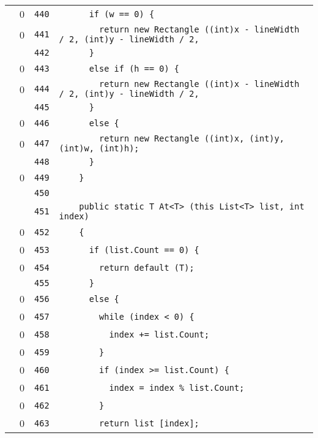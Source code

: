 \documentclass[a4paper,10pt]{article}
\begin{document}
\begin{longtable}[l]{lrrl}
\cellcolor{red} & 0 & \verb~440~ & \verb~      if (w == 0) {~\\
\cellcolor{red} & 0 & \verb~441~ & \verb~        return new Rectangle ((int)x - lineWidth / 2, (int)y - lineWidth / 2, ~\\
\cellcolor{gray} &  & \verb~442~ & \verb~      }~\\
\cellcolor{red} & 0 & \verb~443~ & \verb~      else if (h == 0) {~\\
\cellcolor{red} & 0 & \verb~444~ & \verb~        return new Rectangle ((int)x - lineWidth / 2, (int)y - lineWidth / 2, ~\\
\cellcolor{gray} &  & \verb~445~ & \verb~      }~\\
\cellcolor{red} & 0 & \verb~446~ & \verb~      else {~\\
\cellcolor{red} & 0 & \verb~447~ & \verb~        return new Rectangle ((int)x, (int)y, (int)w, (int)h);~\\
\cellcolor{gray} &  & \verb~448~ & \verb~      }~\\
\cellcolor{red} & 0 & \verb~449~ & \verb~    }~\\
\cellcolor{gray} &  & \verb~450~ & \verb~~\\
\cellcolor{gray} &  & \verb~451~ & \verb~    public static T At<T> (this List<T> list, int index)~\\
\cellcolor{red} & 0 & \verb~452~ & \verb~    {~\\
\cellcolor{red} & 0 & \verb~453~ & \verb~      if (list.Count == 0) {~\\
\cellcolor{red} & 0 & \verb~454~ & \verb~        return default (T);~\\
\cellcolor{gray} &  & \verb~455~ & \verb~      }~\\
\cellcolor{red} & 0 & \verb~456~ & \verb~      else {~\\
\cellcolor{red} & 0 & \verb~457~ & \verb~        while (index < 0) {~\\
\cellcolor{red} & 0 & \verb~458~ & \verb~          index += list.Count;~\\
\cellcolor{red} & 0 & \verb~459~ & \verb~        }~\\
\cellcolor{red} & 0 & \verb~460~ & \verb~        if (index >= list.Count) {~\\
\cellcolor{red} & 0 & \verb~461~ & \verb~          index = index % list.Count;~\\
\cellcolor{red} & 0 & \verb~462~ & \verb~        }~\\
\cellcolor{red} & 0 & \verb~463~ & \verb~        return list [index];~\\

\end{longtable}
\end{document}
